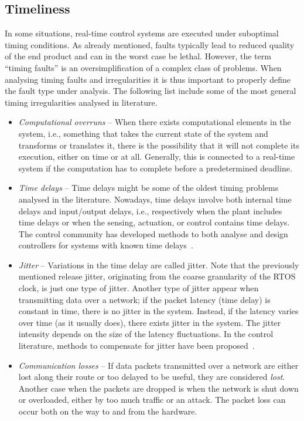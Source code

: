 \subsection*{Timeliness}%
\label{sec:intro:timeliness}%
%
In some situations, real-time control systems are executed under suboptimal timing conditions.
As already mentioned, faults typically lead to reduced quality of the end product and can in the worst case be lethal.
However, the term ``timing faults'' is an oversimplification of a complex class of problems.
When analysing timing faults and irregularities it is thus important to properly define the fault type under analysis.
The following list include some of the most general timing irregularities analysed in literature.
%
\begin{itemize}
    \item \emph{Computational overruns} -- When there exists computational elements in the system, i.e., something that takes the current state of the system and transforms or translates it, there is the possibility that it will not complete its execution, either on time or at all. %
        Generally, this is connected to a real-time system if the computation has to complete before a predetermined deadline.

    \item \emph{Time delays} -- Time delays might be some of the oldest timing problems analysed in the literature.
        Nowadays, time delays involve both internal time delays and input/output delays, i.e., respectively when the plant includes time delays or when the sensing, actuation, or control contains time delays.
        The control community has developed methods to both analyse and design controllers for systems with known time delays~\cite{Mirkin:2004, Mirkin:2005}.

    \item \emph{Jitter} -- Variations in the time delay are called jitter.
        Note that the previously mentioned release jitter, originating from the coarse granularity of the RTOS clock, is just one type of jitter.
        Another type of jitter appear when transmitting data over a network; if the packet latency (time delay) is constant in time, there is no jitter in the system.
        Instead, if the latency varies over time (as it usually does), there exists jitter in the system.
        The jitter intensity depends on the size of the latency fluctuations.
        In the control literature, methods to compensate for jitter have been proposed~\cite{Cervin:2004}.

    \item \emph{Communication losses} -- If data packets transmitted over a network are either lost along their route or too delayed to be useful, they are considered \emph{lost}.
        Another case when the packets are dropped is when the network is shut down or overloaded, either by too much traffic or an attack.
        The packet loss can occur both on the way to and from the hardware.
\end{itemize}
